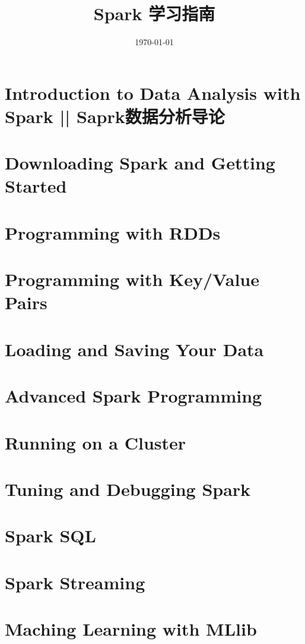 \documentclass[a4paper,11pt,twoside]{ctexbook}
\title{Spark  学习指南  }
\author{}
\date{\today}
\begin{document}
\maketitle
\tableofcontents

\newpage
\chapter {Introduction to Data Analysis with Spark  ||  Saprk数据分析导论}
\label{spark_data_analysis_introduction}


\chapter{Downloading Spark and Getting Started}
\label{downloading-install-spark}


\chapter{Programming with RDDs}

\chapter{Programming with Key/Value Pairs}

\chapter{Loading and Saving Your Data}

\chapter{Advanced Spark Programming}

\chapter{Running on a Cluster}

\chapter{Tuning and Debugging Spark}

\chapter{Spark SQL}

\chapter{Spark Streaming}

\chapter{Maching Learning with MLlib}

\printindex
\end{document}
